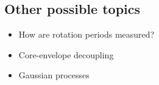 \subsection{Other possible topics}
\begin{itemize}
\item{How are rotation periods measured?}
\item{Core-envelope decoupling}
\item{Gaussian processes}
\end{itemize}



